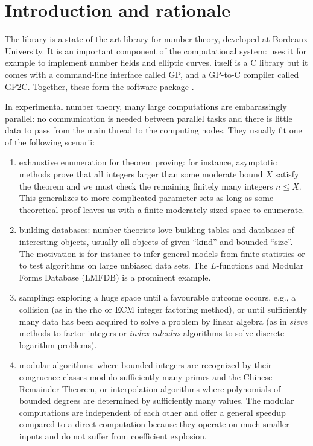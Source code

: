 \documentclass{deliverablereport}
\author{Bill Allombert, Karim Belabas}
\begin{document}
\maketitle
\githubissuedescription
\tableofcontents

\section{Introduction and rationale}

The \Pari library is a state-of-the-art library for number theory,
developed at Bordeaux University. It is an important component of the \Sage
computational system: \Sage uses it for example to implement number fields
and elliptic curves. \Pari itself is a C library but it comes with a
command-line interface called GP, and a GP-to-C compiler called GP2C.
Together, these form the software package \PariGP.

In experimental number theory, many large computations are embarassingly
parallel: no communication is needed between parallel tasks and there is
little data to pass from the main thread to the computing nodes. They usually
fit one of the following scenarii:
\begin{enumerate}
  \item exhaustive enumeration for theorem proving: for instance, asymptotic
    methods prove that all integers larger than some moderate bound $X$
    satisfy the theorem and we must check the remaining finitely many
    integers $n \leq X$. This generalizes to more complicated parameter sets
    as long as some theoretical proof leaves us with a finite
    moderately-sized space to enumerate.

  \item building databases: number theorists love building tables and
    databases of interesting objects, usually all objects of given ``kind''
    and bounded ``size''. The motivation is for instance to infer general
    models from finite statistics or to test algorithms on large unbiased
    data sets. The $L$-functions and Modular Forms Database (LMFDB) is a
    prominent example.
    
  \item sampling: exploring a huge space until a favourable outcome occurs,
    e.g., a collision (as in the rho or ECM integer factoring method), or
    until sufficiently many data has been acquired to solve a problem by
    linear algebra (as in \emph{sieve} methods to factor integers or
    \emph{index calculus} algorithms to solve discrete logarithm problems).
    
  \item modular algorithms: where bounded integers are recognized by their
    congruence classes modulo sufficiently many primes and the Chinese
    Remainder Theorem, or interpolation algorithms where polynomials of
    bounded degrees are determined by sufficiently many values. The modular
    computations are independent of each other and offer a general speedup
    compared to a direct computation because they operate on much smaller 
    inputs and do not suffer from coefficient explosion.
\end{enumerate}
\end{document}
